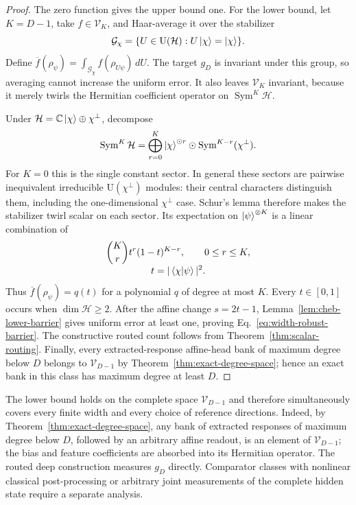 \documentclass[pdflatex,sn-mathphys,NameDate,iicol]{sn-jnl}
\newcommand{\C}{\mathbb{C}}
\newcommand{\Sym}{\operatorname{Sym}}
\newcommand{\cG}{\mathcal{G}}
\newcommand{\cH}{\mathcal{H}}
\newcommand{\cV}{\mathcal{V}}
\begin{document}
\begin{proof}
The zero function gives the upper bound one. For the lower bound, let
$K=D-1$, take $f\in\cV_K$, and Haar-average it over the stabilizer
\begin{equation}
 \cG_\chi=\{U\in\mathrm{U}(\cH):U\ket\chi=\ket\chi\}.
\end{equation}
Define $\overline f(\rho_\psi)=
\int_{\cG_\chi}f(\rho_{U\psi})\,dU$. The target $g_D$ is invariant under
this group, so averaging cannot increase the uniform error. It also leaves
$\cV_K$ invariant, because it merely twirls the Hermitian coefficient
operator on $\Sym^K\cH$.

Under $\cH=\C\ket\chi\oplus\chi^\perp$, decompose
\begin{equation}
 \Sym^K\cH
 =\bigoplus_{r=0}^{K}
 \ket\chi^{\odot r}\odot\Sym^{K-r}(\chi^\perp).
 \label{eq:stabilizer-sector-decomposition}
\end{equation}
For $K=0$ this is the single constant sector. In general these sectors are
pairwise inequivalent irreducible
$\mathrm{U}(\chi^\perp)$ modules: their central characters distinguish them,
including the one-dimensional $\chi^\perp$ case. Schur's lemma therefore
makes the stabilizer twirl scalar on each sector. Its expectation on
$\ket\psi^{\otimes K}$ is a linear combination of
\begin{equation}
 \begin{gathered}
 \binom Kr t^r(1-t)^{K-r},\qquad 0\le r\le K,\\[-1mm]
 t=|\braket{\chi | \psi}|^2.
 \end{gathered}
\end{equation}
Thus $\overline f(\rho_\psi)=q(t)$ for a polynomial $q$ of degree at most
$K$. Every $t\in[0,1]$ occurs when $\dim\cH\ge2$. After the affine change
$s=2t-1$, Lemma~\ref{lem:cheb-lower-barrier} gives uniform error at least
one, proving Eq.~\eqref{eq:width-robust-barrier}. The constructive routed
count follows from Theorem~\ref{thm:scalar-routing}. Finally, every
extracted-response affine-head bank of maximum degree below $D$ belongs to
$\cV_{D-1}$ by Theorem~\ref{thm:exact-degree-space}; hence an exact bank in
this class has maximum degree at least $D$.
\end{proof}

The lower bound holds on the complete space $\cV_{D-1}$ and therefore
simultaneously covers every finite width and every choice of reference
directions. Indeed, by Theorem~\ref{thm:exact-degree-space}, any bank of
extracted responses of maximum degree below $D$, followed by an arbitrary
affine readout, is an element of $\cV_{D-1}$; the bias and feature
coefficients are absorbed into its Hermitian operator. The routed deep
construction measures $g_D$ directly. Comparator classes with nonlinear
classical post-processing or arbitrary joint measurements of the complete
hidden state require a separate analysis.
\end{document}
